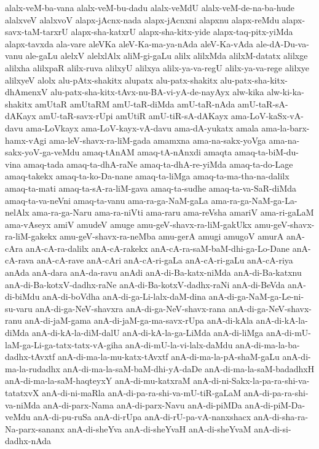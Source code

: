 {alalx-veM-ba-vana
alalx-veM-bu-dadu
alalx-veMdU
alalx-veM-de-na-ba-hude
alalxveV
alalxvoV
alapx-jAcnx-nada
alapx-jAcnxni
alapxnu
alapx-reMdu
alapx-savx-taM-tarxrU
alapx-sha-katxrU
alapx-sha-kitx-yide
alapx-taq-pitx-yiMda
alapx-tavxda
ala-vare
aleVKa
aleV-Ka-ma-ya-nAda
aleV-Ka-vAda
ale-dA-Du-va-vanu
ale-gaLu
alelxV
alelxlAlx
aliM-gi-gaLu
alilx
alilxMda
alilxM-datatx
alilxge
alilxha
alilxpaR
alilx-ruva
alilxyU
alilxya
alilx-ya-va-regU
alilx-ya-va-rege
alilxye
alilxyeV
alolx
alu-pAtx-shakitx
alupatx
alu-patx-shakitx
alu-patx-sha-kitx-dhAmenxV
alu-patx-sha-kitx-tAvx-nu-BA-vi-yA-de-nayAyx
alw-kika
alw-ki-ka-shakitx
amUtaR
amUtaRM
amU-taR-diMda
amU-taR-nAda
amU-taR-sA-dAKayx
amU-taR-savx-rUpi
amUtiR
amU-tiR-sA-dAKayx
ama-LoV-kaSx-vA-davu
ama-LoVkayx
ama-LoV-kayx-vA-davu
ama-dA-yukatx
amala
ama-la-barx-hamx-vAgi
ama-leV-shavx-ra-liM-gada
amamxna
ama-na-sakx-yoVga
ama-na-sakx-yoV-ga-veMdu
amaq-tAnAM
amaq-tA-nAnxdi
amaqta
amaq-ta-biM-du-vina
amaq-tada
amaq-ta-dhA-raNe
amaq-ta-dhA-re-yiMda
amaq-ta-do-Lage
amaq-takekx
amaq-ta-ko-Da-nane
amaq-ta-liMga
amaq-ta-ma-tha-na-dalilx
amaq-ta-mati
amaq-ta-sA-ra-liM-gava
amaq-ta-sudhe
amaq-ta-va-SaR-diMda
amaq-ta-va-neVni
amaq-ta-vanu
ama-ra-ga-NaM-gaLa
ama-ra-ga-NaM-ga-La-nelAlx
ama-ra-ga-Naru
ama-ra-niVti
ama-raru
ama-reVsha
amariV
ama-ri-gaLaM
ama-vAseyx
amiV
amudeV
amuge
amu-geV-shavx-ra-liM-gakUkx
amu-geV-shavx-ra-liM-gakekx
amu-geV-shavx-ra-neMba
amu-gerA
amugi
amugoV
amurA
anA-cAra
anA-cA-ra-dalilx
anA-cA-rakekx
anA-cA-ra-saM-baM-dhi-ga-Lo-Dane
anA-cA-rava
anA-cA-rave
anA-cAri
anA-cA-ri-gaLa
anA-cA-ri-gaLu
anA-cA-riya
anAda
anA-dara
anA-da-ravu
anAdi
anA-di-Ba-katx-niMda
anA-di-Ba-katxnu
anA-di-Ba-kotxV-dadhx-raNe
anA-di-Ba-kotxV-dadhx-raNi
anA-di-BeVda
anA-di-biMdu
anA-di-boVdha
anA-di-ga-Li-lalx-daM-dina
anA-di-ga-NaM-ga-Le-ni-su-varu
anA-di-ga-NeV-shavxra
anA-di-ga-NeV-shavx-rana
anA-di-ga-NeV-shavx-ranu
anA-di-jaM-gama
anA-di-jaM-ga-ma-savx-rUpa
anA-di-kAla
anA-di-kA-la-diMda
anA-di-kA-la-diM-dalU
anA-di-kA-la-ga-LiMda
anA-di-liMga
anA-di-mU-laM-ga-Li-ga-tatx-tatx-vA-giha
anA-di-mU-la-vi-lalx-daMdu
anA-di-ma-la-ba-dadhx-tAvxtf
anA-di-ma-la-mu-katx-tAvxtf
anA-di-ma-la-pA-shaM-gaLu
anA-di-ma-la-rudadhx
anA-di-ma-la-saM-baM-dhi-yA-daDe
anA-di-ma-la-saM-badadhxH
anA-di-ma-la-saM-haqteyxY
anA-di-mu-katxraM
anA-di-ni-Sakx-la-pa-ra-shi-va-tatatxvX
anA-di-ni-maRla
anA-di-pa-ra-shi-va-mU-tiR-gaLaM
anA-di-pa-ra-shi-va-niMda
anA-di-parx-Nama
anA-di-parx-Navu
anA-di-piMDa
anA-di-piM-Da-veMdu
anA-di-pu-ruSa
anA-di-rUpa
anA-di-rU-pa-vA-nanxshacx
anA-di-sha-ra-Na-parx-sananx
anA-di-sheYva
anA-di-sheYvaH
anA-di-sheYvaM
anA-di-si-dadhx-nAda
}

